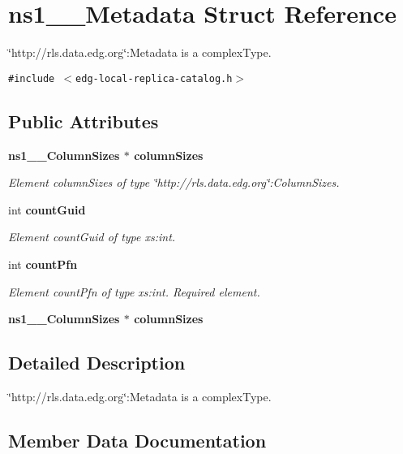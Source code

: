 \section{ns1\_\-\_\-Metadata Struct Reference}
\label{structns1____Metadata}
\char`\"{}http://rls.data.edg.org\char`\"{}:Metadata is a complex\-Type.  


{\tt \#include $<$edg-local-replica-catalog.h$>$}

\subsection*{Public Attributes}
\begin{CompactItemize}
\item 
\bf{ns1\_\-\_\-Column\-Sizes} $\ast$ \bf{column\-Sizes}
\begin{CompactList}\small\item\em Element column\-Sizes of type \char`\"{}http://rls.data.edg.org\char`\"{}:Column\-Sizes. \item\end{CompactList}\item 
int \bf{count\-Guid}
\begin{CompactList}\small\item\em Element count\-Guid of type xs:int. \item\end{CompactList}\item 
int \bf{count\-Pfn}\label{structns1____Metadata_a8715dcbdd5964ee58bc89c79cc00964}

\begin{CompactList}\small\item\em Element count\-Pfn of type xs:int. Required element. \item\end{CompactList}\item 
\bf{ns1\_\-\_\-Column\-Sizes} $\ast$ \textbf{column\-Sizes}\label{structns1____Metadata_d337db8cc3d23fa8d7fe7d23de2bc6cb}

\end{CompactItemize}


\subsection{Detailed Description}
\char`\"{}http://rls.data.edg.org\char`\"{}:Metadata is a complex\-Type. 



\subsection{Member Data Documentation}
